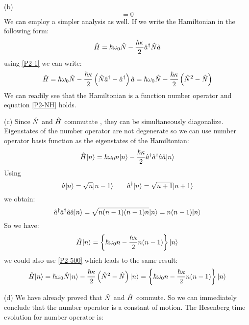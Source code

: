 \begin{homeworkProblem}
\begin{homeworkSection}{(b)}
\begin{equation}
[\A{N},\A{H}]=0
\end{equation}
We can employ a simpler analysis as well. If we write the Hamiltonian in the following form:
\begin{equation*}
\Hat{H}=\hbar\omega_0\Hat{N}-\frac{\hbar\kappa}{2}\Hat{a}^\dagger\Hat{N}\Hat{a}
\end{equation*}
using \eqref{P2-1} we can write:
\begin{equation}\label{P2-500}
\Hat{H}=\hbar\omega_0\Hat{N}-\frac{\hbar\kappa}{2}\left(\Hat{N}\Hat{a}^\dagger-\Hat{a}^\dagger\right)\Hat{a}=
\hbar\omega_0\Hat{N}-\frac{\hbar\kappa}{2}\left(\Hat{N}^2-\Hat{N}\right)
\end{equation}
We can readily see that the Hamiltonian is a function number operator and equation \eqref{P2-NH} holds. 
\end{homeworkSection}
\begin{homeworkSection}{(c)}
Since $\Hat{N}$ and $\Hat{H}$ commutate , they can be simultaneously diagonalize. Eigenstates of the number operator are not degenerate so we can use number operator basis function as the eigenstates of the Hamiltonian:
\begin{equation}
\Hat{H}|n\rangle=\hbar\omega_0 n|n\rangle-\frac{\hbar\kappa}{2}\Hat{a}^\dagger\Hat{a}^\dagger\Hat{a}\Hat{a}|n\rangle
\end{equation} 
Using
\begin{equation*}
\Hat{a}|n\rangle=\sqrt{n}|n-1\rangle\qquad\Hat{a}^\dagger|n\rangle=\sqrt{n+1}|n+1\rangle
\end{equation*}
we obtain:
\begin{equation}
\Hat{a}^\dagger\Hat{a}^\dagger\Hat{a}\Hat{a}|n\rangle=\sqrt{n(n-1)(n-1)n}|n\rangle=n(n-1)|n\rangle
\end{equation}
So we have:
\begin{equation}
\Hat{H}|n\rangle=\left\{\hbar\omega_0 n-\frac{\hbar\kappa}{2}n(n-1)\right\}|n\rangle
\end{equation}
we could also use \eqref{P2-500} which leads to the same result:
\begin{equation}\label{P2-550}
\Hat{H}|n\rangle=\hbar\omega_0\Hat{N}|n\rangle-\frac{\hbar\kappa}{2}\left(\Hat{N}^2-\Hat{N}\right)|n\rangle=
\left\{\hbar\omega_0 n-\frac{\hbar\kappa}{2}n(n-1)\right\}|n\rangle
\end{equation}
\end{homeworkSection}
\begin{homeworkSection}{(d)}
We have already proved that $\Hat{N}$ and $\Hat{H}$ commute. So we can immediately conclude that the number operator is a constant of motion. The Hesenberg time evolution for number operator is:

\end{homeworkSection}
\end{homeworkProblem}
